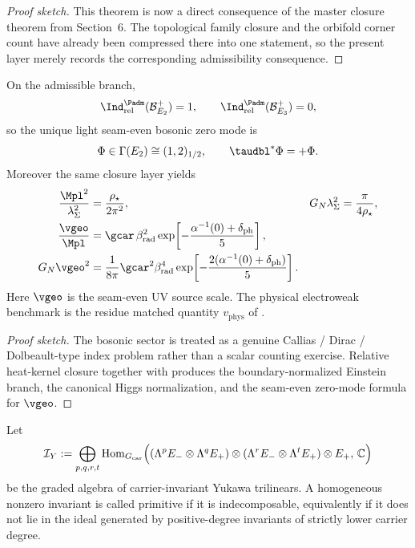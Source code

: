\begin{proof}[Proof sketch]
This theorem is now a direct consequence of the master closure theorem from Section~6. The
topological family closure and the orbifold corner count have already been compressed there
into one statement, so the present layer merely records the corresponding admissibility
consequence.
\end{proof}

\begin{theorem}
On the admissible branch,
\[
\Ind_{\mathrm{rel}}^{\Padm}(\mathcal B_{E_2}^+)=1,
\qquad
\Ind_{\mathrm{rel}}^{\Padm}(\mathcal B_{E_3}^+)=0,
\]
so the unique light seam-even bosonic zero mode is
\[
\Phi\in\Gamma(E_2)\cong(1,2)_{1/2},
\qquad
\taudbl^{\ast}\Phi=+\Phi.
\]
Moreover the same closure layer yields
\[
\begin{aligned}
\frac{\Mpl^2}{\lambda_\Sigma^2}&=\frac{\rho_\star}{2\pi^2},
&
G_N\lambda_\Sigma^2&=\frac{\pi}{4\rho_\star},
\\
\frac{\vgeo}{\Mpl}&=\gcar\,\beta_{\mathrm{rad}}^2
\exp\!\left[-\frac{\alpha^{-1}(0)+\delta_{\mathrm{ph}}}{5}\right],
\\
G_N\vgeo^2&=\frac{1}{8\pi}\gcar^2\beta_{\mathrm{rad}}^4
\exp\!\left[-\frac{2(\alpha^{-1}(0)+\delta_{\mathrm{ph}})}{5}\right].
\end{aligned}
\]
Here $\vgeo$ is the seam-even UV source scale. The physical electroweak benchmark is the residue
matched quantity $v_{\mathrm{phys}}$ of .
\end{theorem}

\begin{proof}[Proof sketch]
The bosonic sector is treated as a genuine Callias / Dirac / Dolbeault-type index problem rather
than a scalar counting exercise. Relative heat-kernel closure together with
produces the boundary-normalized Einstein branch, the canonical Higgs normalization, and the
seam-even zero-mode formula for $\vgeo$.
\end{proof}

\begin{definition}
\label{def:primitive-yukawa-generator}
Let
\[
\mathcal I_Y
:=
\bigoplus_{p,q,r,t}
\operatorname{Hom}_{G_{\mathrm{car}}}
\Bigl(
(\Lambda^p E_-\otimes \Lambda^q E_+)
\otimes
(\Lambda^r E_-\otimes \Lambda^t E_+)
\otimes E_+,\,
\mathbb C
\Bigr)
\]
be the graded algebra of carrier-invariant Yukawa trilinears. A homogeneous nonzero invariant is
called primitive if it is indecomposable, equivalently if it does not lie in the ideal generated by
positive-degree invariants of strictly lower carrier degree.
\end{definition}

